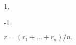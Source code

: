 \documentclass[11pt]{amsbook}
\begin{document}
\begin{hEnumerateArabic}
	
	\setcounter{enumi}{207}
	\item  
	\begin{hEnumerateAlpha}
		\begin{multicols}{2}
			\item 1,
		\columnbreak
			\item -1
		\end{multicols}
	\end{hEnumerateAlpha}
	
	\setcounter{enumi}{209}
	\item $ r = (r_1 + \ldots + r_n ) / n. $
\end{hEnumerateArabic}






\end{document}
